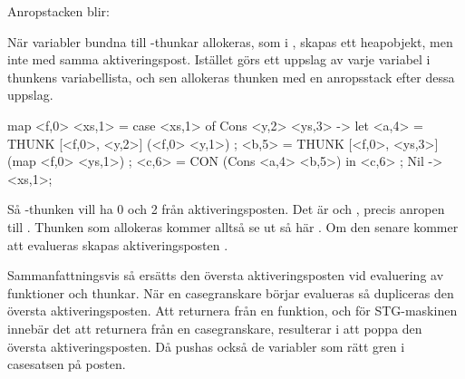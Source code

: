 \documentclass[../Core]{subfiles}
\begin{document}
Anropstacken blir:
\begin{codeEx}
\end{codeEx}

När variabler bundna till -thunkar allokeras, som 
i , skapas ett heapobjekt, men inte med samma aktiveringspost.
Istället görs ett uppslag av varje variabel i thunkens variabellista, och
sen allokeras thunken med en anropsstack efter dessa uppslag. 

\begin{codeEx}
map <f,0> <xs,1> = case <xs,1> of
    { Cons <y,2> <ys,3> -> let
        { <a,4> = THUNK [<f,0>, <y,2>]  (<f,0> <y,1>)
        ; <b,5> = THUNK [<f,0>, <ys,3>] (map <f,0> <ys,1>)
        ; <c,6> = CON (Cons <a,4> <b,5>)
        } in <c,6>
    ; Nil -> <xs,1>};
\end{codeEx}

Så -thunken  vill ha 0 och 2 från
aktiveringsposten. Det är  och , precis anropen till
. 
Thunken som allokeras kommer alltså se ut så här
.
Om den senare kommer att evalueras skapas aktiveringsposten \miniCode{[cube,1]}.


Sammanfattningsvis så ersätts den översta aktiveringsposten vid 
evaluering av funktioner och thunkar. När en casegranskare börjar evalueras
så dupliceras den översta aktiveringsposten. Att returnera från en funktion,
och för STG-maskinen innebär det att returnera från en casegranskare,
resulterar i att poppa den översta aktiveringsposten. Då pushas också 
de variabler som rätt gren i casesatsen på posten.  





   



 
\end{document}
